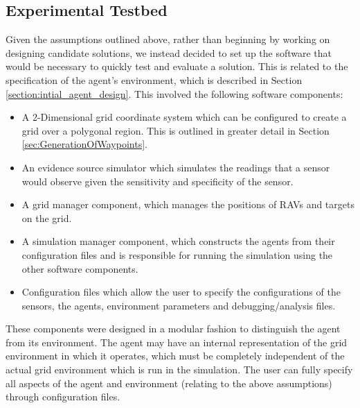 \subsection{Experimental Testbed}
Given the assumptions outlined above, rather than beginning by working on designing candidate solutions, we instead decided to set up the software that would be necessary to quickly test and evaluate a solution. This is related to the specification of the agent's environment, which is described in Section \ref{section:intial_agent_design}. This involved the following software components:
\begin{itemize}
    \item A 2-Dimensional grid coordinate system which can be configured to create a grid over a polygonal region. This is outlined in greater detail in Section \ref{sec:GenerationOfWaypoints}.
    \item An evidence source simulator which simulates the readings that a sensor would observe given the sensitivity and specificity of the sensor.
    \item A grid manager component, which manages the positions of RAVs and targets on the grid.
    \item A simulation manager component, which constructs the agents from their configuration files and is responsible for running the simulation using the other software components.
    \item Configuration files which allow the user to specify the configurations of the sensors, the agents, environment parameters and debugging/analysis files.
\end{itemize}
These components were designed in a modular fashion to distinguish the agent from its environment. The agent may have an internal representation of the grid environment in which it operates, which must be completely independent of the actual grid environment which is run in the simulation. The user can fully specify all aspects of the agent and environment (relating to the above assumptions) through configuration files. 
